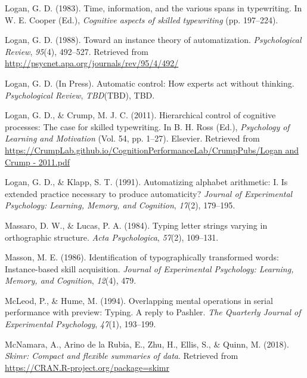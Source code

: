 \documentclass[floatsintext,man]{apa6}
\theoremstyle{definition}
\theoremstyle{definition}
\theoremstyle{definition}
\theoremstyle{remark}
\begin{document}
\hypertarget{ref-logan_span_1983}{}
Logan, G. D. (1983). Time, information, and the various spans in
typewriting. In W. E. Cooper (Ed.), \emph{Cognitive aspects of skilled
typewriting} (pp. 197--224).

\hypertarget{ref-logan_toward_1988}{}
Logan, G. D. (1988). Toward an instance theory of automatization.
\emph{Psychological Review}, \emph{95}(4), 492--527. Retrieved from
\url{http://psycnet.apa.org/journals/rev/95/4/492/}

\hypertarget{ref-logan_inpress}{}
Logan, G. D. (In Press). Automatic control: How experts act without
thinking. \emph{Psychological Review}, \emph{TBD}(TBD), TBD.

\hypertarget{ref-logan_hierarchical_2011}{}
Logan, G. D., \& Crump, M. J. C. (2011). Hierarchical control of
cognitive processes: The case for skilled typewriting. In B. H. Ross
(Ed.), \emph{Psychology of Learning and Motivation} (Vol. 54, pp.
1--27). Elsevier. Retrieved from
\href{https://CrumpLab.github.io/CognitionPerformanceLab/CrumpPubs/Logan\%20and\%20Crump\%20-\%202011.pdf}{https://CrumpLab.github.io/CognitionPerformanceLab/CrumpPubs/Logan and Crump - 2011.pdf}

\hypertarget{ref-logan_automatizing_1991}{}
Logan, G. D., \& Klapp, S. T. (1991). Automatizing alphabet arithmetic:
I. Is extended practice necessary to produce automaticity? \emph{Journal
of Experimental Psychology: Learning, Memory, and Cognition},
\emph{17}(2), 179--195.

\hypertarget{ref-massaro_typing_1984}{}
Massaro, D. W., \& Lucas, P. A. (1984). Typing letter strings varying in
orthographic structure. \emph{Acta Psychologica}, \emph{57}(2),
109--131.

\hypertarget{ref-MassonIdentificationtypographicallytransformed1986}{}
Masson, M. E. (1986). Identification of typographically transformed
words: Instance-based skill acquisition. \emph{Journal of Experimental
Psychology: Learning, Memory, and Cognition}, \emph{12}(4), 479.

\hypertarget{ref-mcleod_overlapping_1994}{}
McLeod, P., \& Hume, M. (1994). Overlapping mental operations in serial
performance with preview: Typing. A reply to Pashler. \emph{The
Quarterly Journal of Experimental Psychology}, \emph{47}(1), 193--199.

\hypertarget{ref-R-skimr}{}
McNamara, A., Arino de la Rubia, E., Zhu, H., Ellis, S., \& Quinn, M.
(2018). \emph{Skimr: Compact and flexible summaries of data}. Retrieved
from \url{https://CRAN.R-project.org/package=skimr}
\end{document}
